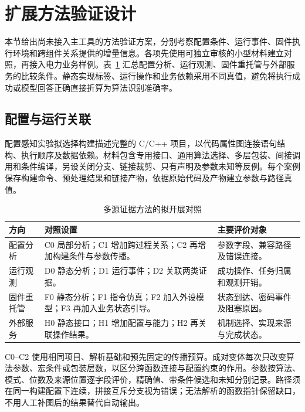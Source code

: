 \section{扩展方法验证设计}
\label{sec:multisource-extension-plan}
\label{sec:llm-extension-plan}

本节给出尚未接入主工具的方法验证方案，分别考察配置条件、运行事件、固件执行环境和跨组件关系提供的增量信息。各项先使用可独立审核的小型材料建立对照，再接入电力业务样例。表~\ref{tab:multisource-extension-design} 汇总配置分析、运行观测、固件重托管与外部服务的比较条件。静态实现标签、运行操作和业务依赖采用不同真值，避免将执行成功或模型回答正确直接折算为算法识别准确率。

\subsection{配置与运行关联}
\label{subsec:config-cpg-experiment}

配置感知实验拟选择构建描述完整的 C/C++ 项目，以代码属性图连接语句结构、执行顺序及数据依赖。材料包含专用接口、通用算法选择、多层包装、间接调用和条件编译，另设关闭分支、链接裁剪、只有声明及参数未知等反例。每个案例保存构建命令、预处理结果和链接产物，依据原始代码及产物建立参数与路径真值。

\begin{table}[htbp]\centering\small
  \caption{多源证据方法的拟开展对照}
  \label{tab:multisource-extension-design}
  \begin{tabularx}{\linewidth}{@{}>{\raggedright\arraybackslash}p{2.0cm}>{\raggedright\arraybackslash}X>{\raggedright\arraybackslash}p{3.0cm}@{}}\toprule
  方向 & 对照设置 & 主要评价对象\\\midrule
  配置分析 & C0 局部分析；C1 增加跨过程关系；C2 再增加构建条件与参数传播。 & 参数字段、兼容路径及错误连接。\\
  运行观测 & D0 静态分析；D1 运行事件；D2 关联两类证据。 & 成功操作、任务归属和观测开销。\\
  固件重托管 & F0 静态分析；F1 指令仿真；F2 加入外设模型；F3 再加入业务状态引导。 & 状态到达、密码事件及阻塞原因。\\
  外部服务 & H0 静态接口；H1 增加配置与能力；H2 再关联操作结果。 & 机制选择、实现来源与完成状态。\\\bottomrule
  \end{tabularx}
\end{table}

C0--C2 使用相同项目、解析基础和预先固定的传播预算。成对变体每次只改变算法参数、宏条件或包装层数，以区分跨函数连接与配置约束的作用。参数按算法、模式、位数及来源位置逐字段评价，精确值、带条件候选和未知分别记录。路径须在同一构建配置下连续，拼接互斥分支视为错误；无法解析的函数指针保留缺口，不用人工补图后的结果替代自动输出。

